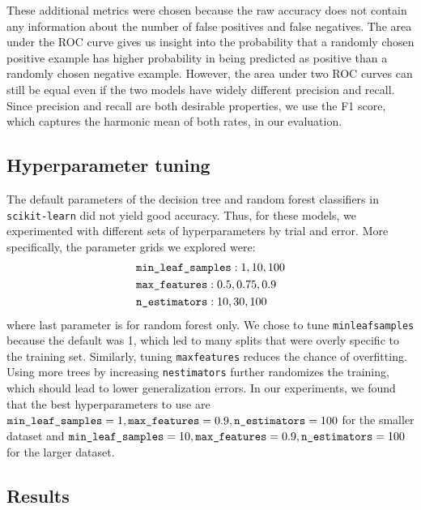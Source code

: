 \documentclass{article} %
\begin{document}
These additional metrics were chosen because the raw accuracy does not contain any information about the number of false positives and false negatives. The area under the ROC curve gives us insight into the probability that a randomly chosen positive example has higher probability in being predicted as positive than a randomly chosen negative example. However, the area under two ROC curves can still be equal even if the two models have widely different precision and recall. Since precision and recall are both desirable properties, we use the F1 score, which captures the harmonic mean of both rates, in our evaluation.

\subsection{Hyperparameter tuning}

The default parameters of the decision tree and random forest classifiers in \texttt{scikit-learn} did not yield good accuracy. Thus, for these models, we experimented with different sets of hyperparameters by trial and error. More specifically, the parameter grids we explored were:
\begin{align*}
&\texttt{min\textunderscore leaf\textunderscore samples}: 1, 10, 100\\
&\texttt{max\textunderscore features}: 0.5, 0.75, 0.9\\
&\texttt{n\textunderscore estimators}: 10, 30, 100
\end{align*}
where last parameter is for random forest only. We chose to tune \texttt{min\textunderscore leaf\textunderscore samples} because the default was 1, which led to many splits that were overly specific to the training set. Similarly, tuning \texttt{max\textunderscore features} reduces the chance of overfitting. Using more trees by increasing \texttt{n\textunderscore estimators} further randomizes the training, which should lead to lower generalization errors. In our experiments, we found that the best hyperparameters to use are $\texttt{min\textunderscore leaf\textunderscore samples} = 1, \texttt{max\textunderscore features} = 0.9, \texttt{n\textunderscore estimators} = 100$ for the smaller dataset and $\texttt{min\textunderscore leaf\textunderscore samples} = 10, \texttt{max\textunderscore features} = 0.9, \texttt{n\textunderscore estimators} = 100$ for the larger dataset.

\newpage
\subsection{Results}
\end{document}

